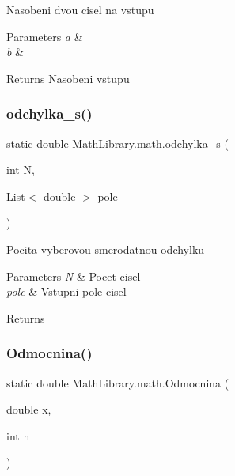 Nasobeni dvou cisel na vstupu 


\begin{DoxyParams}{Parameters}
{\em a} & \\
\hline
{\em b} & \\
\hline
\end{DoxyParams}
\begin{DoxyReturn}{Returns}
Nasobeni vstupu
\end{DoxyReturn}
\mbox{\label{class_math_library_1_1math_a95a9b98b570e2f0ba44042550d9480c1}} 
\subsubsection{\texorpdfstring{odchylka\+\_\+s()}{odchylka\_s()}}
{\footnotesize\ttfamily static double Math\+Library.\+math.\+odchylka\+\_\+s (\begin{DoxyParamCaption}\item[{int}]{N,  }\item[{List$<$ double $>$}]{pole }\end{DoxyParamCaption})\hspace{0.3cm}{\ttfamily [static]}}



Pocita vyberovou smerodatnou odchylku 


\begin{DoxyParams}{Parameters}
{\em N} & Pocet cisel\\
\hline
{\em pole} & Vstupni pole cisel\\
\hline
\end{DoxyParams}
\begin{DoxyReturn}{Returns}

\end{DoxyReturn}
\mbox{\label{class_math_library_1_1math_aa28f90e3e657831aa9d634f1d0410413}} 
\subsubsection{\texorpdfstring{Odmocnina()}{Odmocnina()}}
{\footnotesize\ttfamily static double Math\+Library.\+math.\+Odmocnina (\begin{DoxyParamCaption}\item[{double}]{x,  }\item[{int}]{n }\end{DoxyParamCaption})\hspace{0.3cm}{\ttfamily [static]}}



